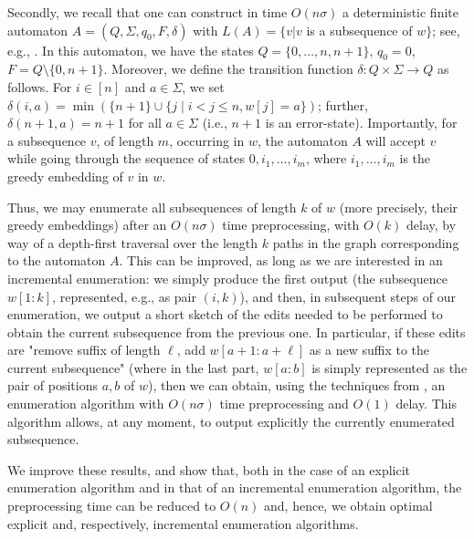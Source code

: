 \documentclass[runningheads,UKenglish,cleveref, autoref, thm-restate]{llncs}
\begin{document}
Secondly, we recall that one can construct in time $O(n\sigma)$ a deterministic finite automaton $A = (Q,\Sigma,q_0, F, \delta)$ with $L(A) = \{v | v$ is a subsequence of $w\}$; see, e.g., \cite{CrochemoreMT03}. In this automaton, we have the states $Q = \{0,\ldots,n,n+1\}$, $q_0 = 0$, $F=Q\setminus \{0,n+1\}$. Moreover, we define the transition function $\delta:Q\times\Sigma\rightarrow Q$ as follows. For $i\in [n]$ and $a\in \Sigma$, we set $\delta(i,a) =  \min (\{n+1\}\cup \{j\mid i<j\leq n, w[j]=a\}) $; further, $\delta(n+1,a)=n+1$ for all $a\in \Sigma $ (i.e., $n+1$ is an error-state). Importantly, for a subsequence $v$, of length $m$, occurring in $w$, the automaton $A$ will accept $v$ while going through the sequence of states $0, i_1, \ldots, i_m$, where $i_1, \ldots, i_m$ is the greedy embedding of $v$ in $w$. 

Thus, we may enumerate all subsequences of length $k$ of $w$ (more precisely, their greedy embeddings) after an $O(n\sigma)$ time preprocessing, with $O(k)$ delay, by way of a depth-first traversal over the length $k$ paths in the graph corresponding to the automaton $A$.
This can be improved, as long as we are interested in an incremental enumeration: we simply produce the first output (the subsequence $w[1:k]$, represented, e.g., as pair $(i,k)$), and then, in subsequent steps of our enumeration, we output a short sketch of the edits needed to be performed to obtain the current subsequence from the previous one. In particular, if these edits are "remove suffix of length $\ell$, add $w[a+1:a+\ell]$ as a new suffix to the current subsequence" (where in the last part, $w[a:b]$ is simply represented as the pair of positions $a,b$ of $w$), then we can obtain, using the techniques from \cite{AdamsonGM24}, an enumeration algorithm with $O(n\sigma)$ time preprocessing and $O(1)$ delay. This algorithm allows, at any moment, to output explicitly the currently enumerated subsequence.

We improve these results, and show that, both in the case of an explicit enumeration algorithm and in that of an incremental enumeration algorithm, the preprocessing time can be reduced to $O(n)$ and, hence, we obtain optimal explicit and, respectively, incremental enumeration algorithms. 
\end{document}
